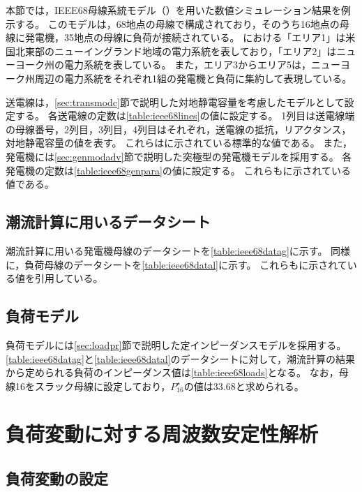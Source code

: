 \documentclass[tombow,dvipdfmx]{corona-a5-1.1}
\begin{document}
本節では，IEEE68母線系統モデル（）を用いた数値シミュレーション結果を例示する。
このモデルは，68地点の母線で構成されており，そのうち16地点の母線に発電機，35地点の母線に負荷が接続されている。
における「エリア1」は米国北東部のニューイングランド地域の電力系統を表しており，「エリア2」はニューヨーク州の電力系統を表している。
また，エリア3からエリア5は，ニューヨーク州周辺の電力系統をそれぞれ1組の発電機と負荷に集約して表現している。



送電線は，\ref{sec:transmodc}節で説明した対地静電容量を考慮したモデルとして設定する。
各送電線の定数は\ref{table:ieee68lines}の値に設定する。
1列目は送電線端の母線番号，2列目，3列目，4列目はそれぞれ，送電線の抵抗，リアクタンス，対地静電容量の値を表す。
これらは\cite[Appendix A]{pal2006robust}に示されている標準的な値である。
また，発電機には\ref{sec:genmodadv}節で説明した突極型の発電機モデルを採用する。
各発電機の定数は\ref{table:ieee68genpara}の値に設定する。
これらも\cite[Appendix B]{pal2006robust}に示されている値である。



\subsection{潮流計算に用いるデータシート}


潮流計算に用いる発電機母線のデータシートを\ref{table:ieee68datag}に示す。
同様に，負荷母線のデータシートを\ref{table:ieee68datal}に示す。
これらも\cite[Appendix A]{pal2006robust}に示されている値を引用している。


\subsection{負荷モデル}

負荷モデルには\ref{sec:loadpr}節で説明した定インピーダンスモデルを採用する。
\ref{table:ieee68datag}と\ref{table:ieee68datal}のデータシートに対して，潮流計算の結果から定められる負荷のインピーダンス値は\ref{table:ieee68loads}となる。
なお，母線16をスラック母線に設定しており，$P_{16}^{\star}$の値は33.68と求められる。





\section{負荷変動に対する周波数安定性解析}\label{sec:IEEE68AGC}

\subsection{負荷変動の設定}
\end{document}

